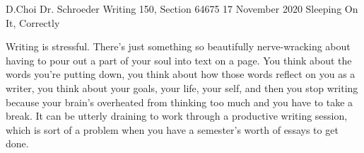 \documentclass[12pt, letterpaper]{article}
\begin{document}
\begin{mla}
	{D.}{Choi}
	{Dr. Schroeder}
	{Writing 150, Section 64675}
	{17 November 2020}
	{Sleeping On It, Correctly}


Writing is stressful. There's just something so beautifully nerve-wracking
about having to pour out a part of your soul into text on a page. You think
about the words you're putting down, you think about how those words reflect
on you as a writer, you think about your goals, your life, your self, and then
you stop writing because your brain's overheated from thinking too much and
you have to take a break. It can be utterly draining to work through a
productive writing session, which is sort of a problem when you have a
semester's worth of essays to get done.


\begin{workscited}
\end{workscited}


\end{mla}
\end{document}
